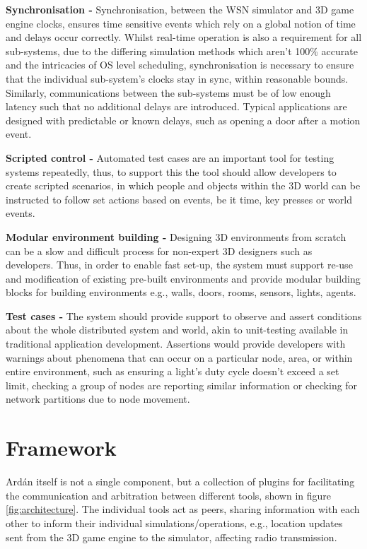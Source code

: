 \textbf{Synchronisation - }
Synchronisation, between the WSN simulator and 3D game engine clocks, ensures time sensitive events which rely on a global notion of time and delays occur correctly. Whilst real-time operation is also a requirement for all sub-systems, due to the differing simulation methods which aren't 100\% accurate and the intricacies of OS level scheduling, synchronisation is necessary to ensure that the individual sub-system's clocks stay in sync, within reasonable bounds. Similarly, communications between the sub-systems must be of low enough latency such that no additional delays are introduced. Typical applications are designed with predictable or known delays, such as opening a door after a motion event.

\textbf{Scripted control - }
Automated test cases are an important tool for testing systems repeatedly, thus, to support this the tool should allow developers to create scripted scenarios, in which people and objects within the 3D world can be instructed to follow set actions based on events, be it time, key presses or world events.

\textbf{Modular environment building - }
Designing 3D environments from scratch can be a slow and difficult process for non-expert 3D designers such as developers. Thus, in order to enable fast set-up, the system must support re-use and modification of existing pre-built environments and provide modular building blocks for building environments e.g., walls, doors, rooms, sensors, lights, agents.



\textbf{Test cases - }
The system should provide support to observe and assert conditions about the whole distributed system and world, akin to unit-testing available in traditional application development. Assertions would provide developers with warnings about phenomena that can occur on a particular node, area, or within entire environment, such as ensuring a light's duty cycle doesn't exceed a set limit, checking a group of nodes are reporting similar information or checking for network partitions due to node movement.


\section{Framework}
\label{sec:Design}
Ard\'{a}n itself is not a single component, but a collection of plugins for facilitating the communication and arbitration between different tools, shown in figure \ref{fig:architecture}. The individual tools act as peers, sharing information with each other to inform their individual simulations/operations, e.g., location updates sent from the 3D game engine to the simulator, affecting radio transmission.

